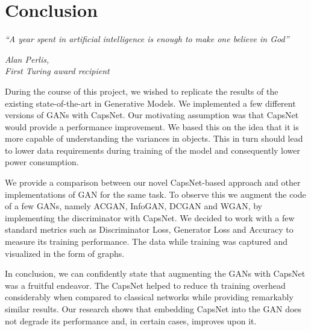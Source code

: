 \chapter{Conclusion}\label{ch:conclusion}
\epigraph{\textit{\normalsize “A year spent in artificial intelligence is enough to make one believe in God”}}{\textit{ \normalsize Alan Perlis,\\ First Turing award recipient}}

During the course of this project, we wished to replicate the results of the existing state-of-the-art in Generative Models. We implemented a few different versions of GANs with CapsNet. Our motivating assumption was that CapsNet would provide a performance improvement. We based this on the idea that it is more capable of understanding the variances in objects. This in turn should lead to lower data requirements during training of the model and consequently lower power consumption. 
\par\bigskip 

We provide a comparison between our novel CapsNet-based approach and other implementations of GAN for the same task. To observe this we augment the code of a few GANs, namely ACGAN, InfoGAN, DCGAN and WGAN, by implementing the discriminator with CapsNet. We decided to work with a few standard metrics such as Discriminator Loss, Generator Loss and Accuracy to measure its training performance. The data while training was captured and visualized in the form of graphs.
\par\bigskip 



In conclusion, we can confidently state that augmenting the GANs with CapsNet was a fruitful endeavor. The CapsNet helped to reduce th training overhead considerably when compared to classical networks while providing remarkably similar results. Our research shows that embedding CapsNet into the GAN does not degrade its performance and, in certain cases, improves upon it.


